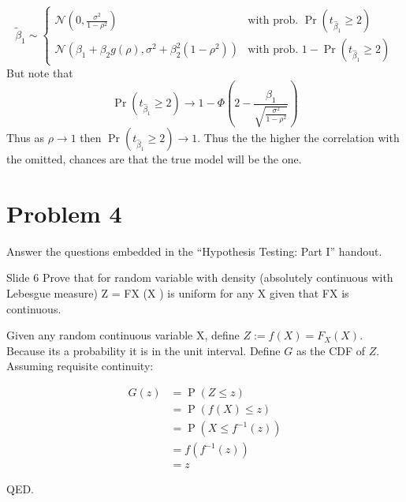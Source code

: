 \documentclass{article}
\begin{document}
\begin{solution}
\begin{enumerate}[label=(\alph*)]
\begin{equation*}
        \tilde{\beta}_1\sim\begin{cases}
        \mathcal{N}\left(0,\frac{\sigma^2}{1-\rho^2}\right) &\mbox{with prob. } \Pr(t_{\hat{\beta}_1}\geq 2) \\ 
        \mathcal{N}\left(\beta_1+\beta_2g(\rho),\sigma^2+\beta_2^2(1-\rho^2)\right) &\mbox{with prob. } 1-\Pr(t_{\hat{\beta}_1}\geq 2)
        \end{cases}
    \end{equation*}
    But note that 
    \begin{equation*}
        \Pr(t_{\hat{\beta}_1}\geq 2) \longrightarrow 1-\Phi\left(2-\frac{\beta_1}{\sqrt{\frac{\sigma^2}{1-\rho^2}}} \right) 
    \end{equation*}
    Thus as $\rho\to 1$ then $\Pr(t_{\hat{\beta}_1}\geq 2)\to 1$. Thus the the higher the correlation with the omitted, chances are that the true model will be the one. 
\end{enumerate}

\end{solution}

\newpage

\section*{Problem 4}
Answer the questions embedded in the ``Hypothesis Testing: Part I'' handout.

\begin{problem}{Slide 6}
Prove that for random variable with density (absolutely continuous with
Lebesgue measure) Z = FX (X ) is uniform for any X given
that FX is continuous.
\end{problem}

\begin{solution}
Given any random continuous variable X, define $Z := f(X) = F_X(X)$. Because its a probability it is in the unit interval. Define $G$ as the CDF of $Z$. Assuming requisite continuity:

\begin{align*}
G(z) &= \operatorname{P}(Z\leq z) \\
        &= \operatorname{P}(f(X)\leq z) \\
        &= \operatorname{P}(X\leq f^{-1}(z)) \\
        &= f (f^{-1}(z)) \\
        &= z
\end{align*}

QED.

\end{solution}
\end{document}
